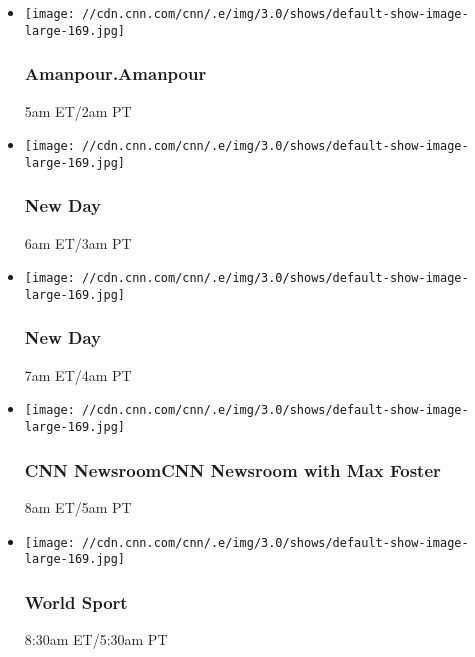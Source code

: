 \begin{itemize}
\item
  \texttt{[image: //cdn.cnn.com/cnn/.e/img/3.0/shows/default-show-image-large-169.jpg]}

  \hypertarget{amanpouramanpour--2}{%
  \subsubsection{Amanpour.Amanpour }\label{amanpouramanpour--2}}

  5am ET/2am PT
\end{itemize}

\begin{itemize}
\item
  \texttt{[image: //cdn.cnn.com/cnn/.e/img/3.0/shows/default-show-image-large-169.jpg]}

  \hypertarget{new-day-2}{%
  \subsubsection{New Day}\label{new-day-2}}

  6am ET/3am PT
\end{itemize}

\begin{itemize}
\item
  \texttt{[image: //cdn.cnn.com/cnn/.e/img/3.0/shows/default-show-image-large-169.jpg]}

  \hypertarget{new-day-3}{%
  \subsubsection{New Day}\label{new-day-3}}

  7am ET/4am PT
\end{itemize}

\begin{itemize}
\item
  \texttt{[image: //cdn.cnn.com/cnn/.e/img/3.0/shows/default-show-image-large-169.jpg]}

  \hypertarget{cnn-newsroomcnn-newsroom-with-max-foster--1}{%
  \subsubsection{CNN NewsroomCNN Newsroom with Max Foster
  }\label{cnn-newsroomcnn-newsroom-with-max-foster--1}}

  8am ET/5am PT
\end{itemize}

\begin{itemize}
\item
  \texttt{[image: //cdn.cnn.com/cnn/.e/img/3.0/shows/default-show-image-large-169.jpg]}

  \hypertarget{world-sport-11}{%
  \subsubsection{World Sport}\label{world-sport-11}}

  8:30am ET/5:30am PT
\end{itemize}

